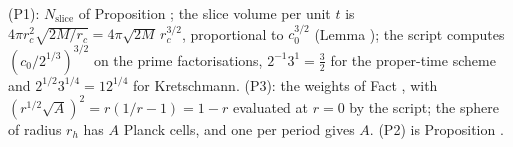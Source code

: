 (P1): $N_{\mathrm{slice}}$ of Proposition ; the slice volume per unit $t$ is $4\pi r_c^2\sqrt{2M/r_c} = 4\pi\sqrt{2M}\,r_c^{3/2}$, proportional to $c_0^{3/2}$ (Lemma ); the script computes $(c_0/2^{1/3})^{3/2}$ on the prime factorisations, $2^{-1}3^{1} = \tfrac32$ for the proper-time scheme and $2^{1/2}3^{1/4} = 12^{1/4}$ for Kretschmann. (P3): the weights of Fact , with $(r^{1/2}\sqrt A)^2 = r(1/r - 1) = 1 - r$ evaluated at $r = 0$ by the script; the sphere of radius $r_h$ has $A$ Planck cells, and one per period gives $A$. (P2) is Proposition .
